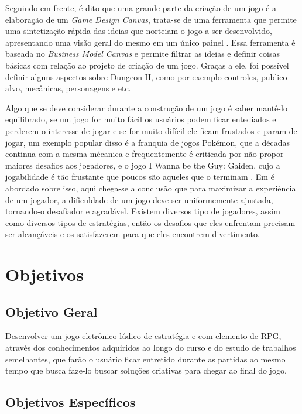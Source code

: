 \documentclass[12pt]{article}
\begin{document}
Seguindo em frente, é dito que uma grande parte da criação de um jogo é a elaboração de um \emph{Game Design Canvas}, trata-se de uma ferramenta que permite uma sintetização rápida das ideias que norteiam o jogo a ser desenvolvido, apresentando uma visão geral do mesmo em um único painel \cite{sarinho2017proposta}. Essa ferramenta é baseada no \emph{Business Model Canvas} e permite filtrar as ideias e definir coisas básicas com relação ao projeto de criação de um jogo. Graças a ele, foi possível definir alguns aspectos sobre Dungeon II, como por exemplo controles, publico alvo, mecânicas, personagens e etc.

Algo que se deve considerar durante a construção de um jogo é saber mantê-lo equilibrado, se um jogo for muito fácil os usuários podem ficar entediados e perderem o interesse de jogar e se for muito difícil ele ficam frustados e param de jogar, um exemplo popular disso é a franquia de jogos Pokémon, que a décadas continua com a mesma mécanica e frequentemente é criticada por não propor maiores desafios aos jogadores, e o jogo I Wanna be the Guy: Gaiden, cujo a jogabilidade é tão frustante que poucos são aqueles que o terminam . Em \cite{bostan2009game} é abordado sobre isso, aqui chega-se a conclusão que para maximizar a experiência de um jogador, a dificuldade de um jogo deve ser uniformemente ajustada, tornando-o desafiador e agradável. Existem diversos tipo de jogadores, assim como diversos tipos de estratégias, então os desafios que eles enfrentam precisam ser alcançáveis e os satisfazerem para que eles encontrem divertimento.

\section{Objetivos}

\subsection{Objetivo Geral}

Desenvolver um jogo eletrônico lúdico de estratégia e com elemento de RPG, através dos conhecimentos adquiridos ao longo do curso e do estudo de trabalhos semelhantes, que farão o usuário ficar entretido durante as partidas ao mesmo tempo que busca faze-lo buscar soluções criativas para chegar ao final do jogo.

\subsection{Objetivos Específicos}
\end{document}
